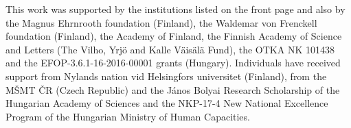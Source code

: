 This work was supported by the institutions listed on the front page and also by the Magnus Ehrnrooth foundation (Finland), the Waldemar von Frenckell foundation (Finland), the Academy of Finland, the Finnish Academy of Science and Letters (The Vilho, Yrj\"o and Kalle V\"ais\"al\"a Fund), the OTKA NK 101438 and the EFOP-3.6.1-16-2016-00001 grants (Hungary). Individuals have received support from Nylands nation vid Helsingfors universitet (Finland), from the M\v SMT \v CR (Czech Republic) and the J\'anos Bolyai Research Scholarship of the Hungarian Academy of Sciences and the NKP-17-4 New National Excellence Program of the Hungarian Ministry of Human Capacities.
